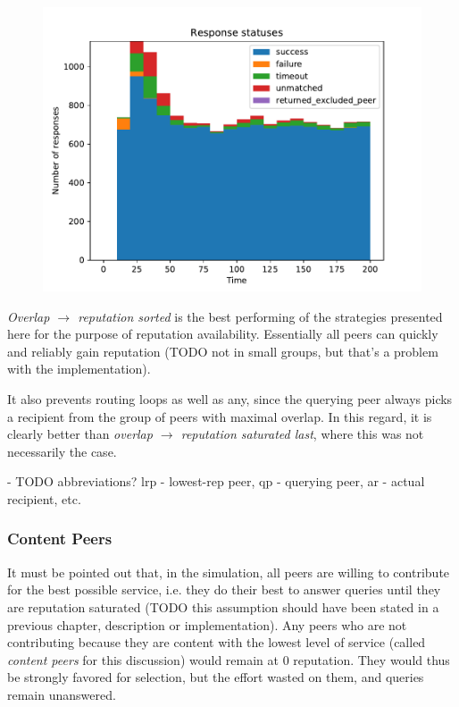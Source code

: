 \begin{figure}[t]
\centering
\includegraphics[width=1\columnwidth]{figures/selection_overlap_rep_sorted_resp_statuses}
\label{fig:selection_overlap_rep_sorted_resp_statuses}
\end{figure}

\emph{Overlap $\rightarrow$ reputation sorted} is the best performing of the
strategies presented here for the purpose of reputation availability.
Essentially all peers can quickly and reliably gain reputation (TODO not in
small groups, but that's a problem with the implementation).

It also prevents routing loops as well as any, since the querying peer always
picks a recipient from the group of peers with maximal overlap. In this regard,
it is clearly better than \emph{overlap $\rightarrow$ reputation saturated
last}, where this was not necessarily the case.

- TODO abbreviations? lrp - lowest-rep peer, qp - querying peer, ar - actual
  recipient, etc.

\subsubsection{Content Peers}
It must be pointed out that, in the simulation, all peers are willing to
contribute for the best possible service, i.e. they do their best to answer
queries until they are reputation saturated (TODO this assumption should have
been stated in a previous chapter, description or implementation). Any peers who
are not contributing because they are content with the lowest level of service
(called \emph{content peers} for this discussion) would remain at 0 reputation.
They would thus be strongly favored for selection, but the effort wasted on
them, and queries remain unanswered.

